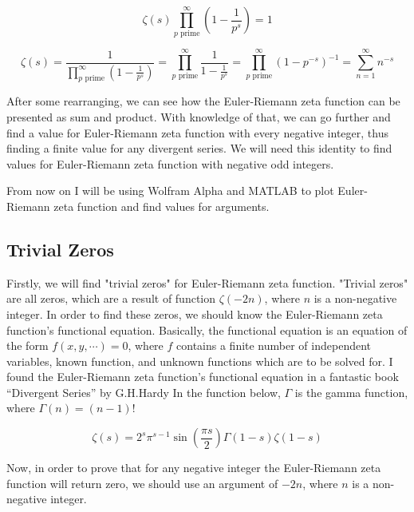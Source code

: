 \documentclass[a4paper]{article}
\begin{document}
\begin{equation*}
    \zeta(s)\prod_{p \text{ prime}}^{\infty} (1-\frac{1}{p^s})=1
\end{equation*}

\begin{equation*}
  \zeta(s)=\frac{1}{\prod_{p \text{ prime}}^{\infty} (1-\frac{1}{p^s})}=\prod_{p \text{ prime}}^{\infty} \frac{1}{1-\frac{1}{p^s}}=
  \prod_{p \text{ prime}}^{\infty} (1-p^{-s})^{-1}=\sum_{n=1}^{\infty} n^{-s}
  \end{equation*}

After some rearranging, we can see how the Euler-Riemann zeta function can be
presented as sum and product. With knowledge of that, we can go further and find
a value for Euler-Riemann zeta function with every negative integer, thus
finding a finite value for any divergent series. We will need this identity to
find values for Euler-Riemann zeta function with negative odd integers. 

From now on I will be using Wolfram Alpha and MATLAB to plot Euler-Riemann zeta
function and find values for arguments.

\subsection{Trivial Zeros}
\label{sec:orgf8d0d02}

Firstly, we will find "trivial zeros" for Euler-Riemann zeta function. "Trivial
zeros" are all zeros, which are a result of function \(\zeta(-2n)\), where \(n\) is
a non-negative integer. In order to find these zeros, we should know the
Euler-Riemann zeta function's functional equation. Basically, the functional
equation \cite{Func} is an equation of the form \(f(x, y, \cdots ) = 0\), where \(f\)
contains a finite number of independent variables, known function, and unknown
functions which are to be solved for. I found the Euler-Riemann zeta function's
functional equation in a fantastic book “Divergent Series” by
G.H.Hardy \cite{Hardy} In the function below, \(\Gamma\) is the gamma function,
where \(\Gamma(n) = (n-1)!\) 

\begin{equation}
  \zeta(s)=2^s\pi^{s-1}\sin(\frac{\pi s}{2})\Gamma(1-s)\zeta(1-s)
  \end{equation}

Now, in order to prove that for any negative integer the Euler-Riemann zeta
function will return zero, we should use an argument of \(-2n\), where \(n\) is a
non-negative integer. 
\end{document}
